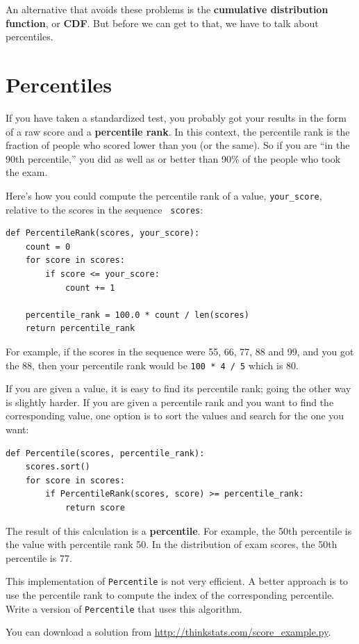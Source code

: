 \documentclass[12pt]{book}
\begin{document}
An alternative that avoids these problems is the {\bf cumulative
distribution function}, or {\bf CDF}.  But before we can get to that,
we have to talk about percentiles.


\section{Percentiles}

If you have taken a standardized test, you probably got your
results in the form of a raw score and a {\bf percentile rank}.
In this context, the percentile rank is the fraction of people who
scored lower than you (or the same).  So if you are ``in the 90th
percentile,'' you did as well as or better than 90\% of the people who
took the exam.

Here's how you could compute the percentile rank of a value,
\verb"your_score", relative to the scores in the sequence {\tt
  scores}:
%
\begin{verbatim}
def PercentileRank(scores, your_score):
    count = 0
    for score in scores:
        if score <= your_score:
            count += 1

    percentile_rank = 100.0 * count / len(scores)
    return percentile_rank
\end{verbatim}
%
%
For example, if the scores in the sequence were 55, 66, 77, 88 and 99,
and you got the 88, then your percentile rank would be {\tt 100 * 4 / 5}
which is 80.

If you are given a value, it is easy to find its percentile rank; going
the other way is slightly harder.  If you are given a percentile rank
and you want to find the corresponding value, one option is to
sort the values and search for the one you want:
%
\begin{verbatim}
def Percentile(scores, percentile_rank):
    scores.sort()
    for score in scores:
        if PercentileRank(scores, score) >= percentile_rank:
            return score
\end{verbatim}

The result of this calculation is a {\bf percentile}.  For example,
the 50th percentile is the value with percentile rank 50.  In the
distribution of exam scores, the 50th percentile is 77.

\begin{exercise}
This implementation of {\tt Percentile} is not very efficient.  A
better approach is to use the percentile rank to compute the index of
the corresponding percentile.  Write a version of {\tt Percentile} that
uses this algorithm.

You can download a solution from \url{http://thinkstats.com/score_example.py}.

\end{exercise}
\end{document}
